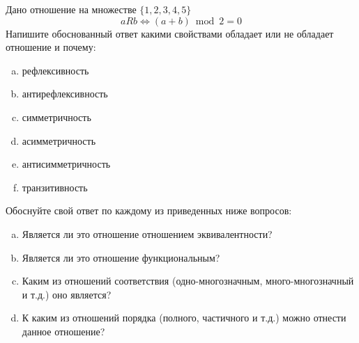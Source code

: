 \question
Дано отношение на множестве $\{1, 2, 3, 4, 5\}$ 
\begin{equation*}
aRb \iff (a+b) \bmod 2 =0
\end{equation*}
Напишите обоснованный ответ какими свойствами обладает или не обладает отношение и почему:   
\begin{enumerate} [a)]\setcounter{enumi}{0}
\item рефлексивность
\item антирефлексивность
\item симметричность
\item асимметричность
\item антисимметричность
\item транзитивность
\end{enumerate}

Обоснуйте свой ответ по каждому из приведенных ниже вопросов:
\begin{enumerate} [a)]\setcounter{enumi}{0}
    \item Является ли это отношение отношением эквивалентности?
    \item Является ли это отношение функциональным?
    \item Каким из отношений соответствия (одно-многозначным, много-многозначный и т.д.) оно является?
    \item К каким из отношений порядка (полного, частичного и т.д.) можно отнести данное отношение?
\end{enumerate}



